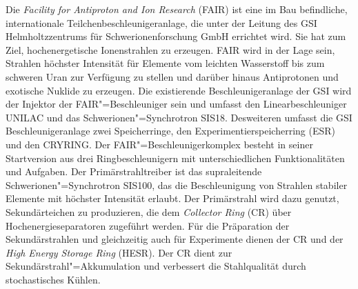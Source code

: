 Die \textit{Facility for Antiproton and Ion Research} (FAIR) ist eine im Bau befindliche, internationale Teilchenbeschleunigeranlage, die unter der Leitung des GSI Helmholtzzentrums f\"ur Schwerionenforschung GmbH errichtet wird. Sie hat zum Ziel, hochenergetische Ionenstrahlen zu erzeugen. FAIR wird in der Lage sein, Strahlen h\"ochster Intensit\"at f\"ur Elemente vom leichten Wasserstoff bis zum schweren Uran zur Verf\"ugung zu stellen und dar\"uber hinaus Antiprotonen und exotische Nuklide zu erzeugen. Die existierende Beschleunigeranlage der GSI wird der Injektor der FAIR"=Beschleuniger sein und umfasst den Linearbeschleuniger UNILAC und das Schwerionen"=Synchrotron SIS18. Desweiteren umfasst die GSI Beschleunigeranlage zwei Speicherringe, den Experimentierspeicherring (ESR) und den CRYRING. Der FAIR"=Beschleunigerkomplex besteht in seiner Startversion aus drei Ringbeschleunigern mit unterschiedlichen Funktionalit\"aten und Aufgaben. Der Prim\"arstrahltreiber ist das supraleitende Schwerionen"=Synchrotron SIS100, das die Beschleunigung von Strahlen stabiler Elemente mit h\"ochster Intensit\"at erlaubt. Der Prim\"arstrahl wird dazu genutzt, Sekund\"arteichen zu produzieren, die dem \textit{Collector Ring} (CR) \"uber Hochenergieseparatoren zugef\"uhrt werden. F\"ur die Pr\"aparation der Sekund\"arstrahlen und gleichzeitig auch f\"ur Experimente dienen der CR und der \textit{High Energy Storage Ring} (HESR). Der CR dient zur Sekund\"arstrahl"=Akkumulation und verbessert die Stahlqualit\"at durch stochastisches K\"uhlen. 

